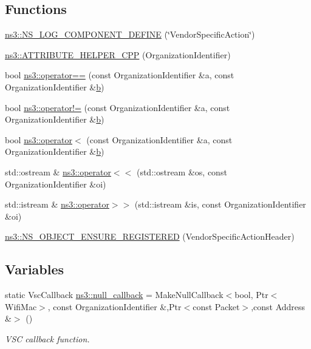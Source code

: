 \subsection*{Functions}
\begin{DoxyCompactItemize}
\item 
\hyperlink{namespacens3_a807d7c8e67d1324dc975f22d670e5a4f}{ns3\+::\+N\+S\+\_\+\+L\+O\+G\+\_\+\+C\+O\+M\+P\+O\+N\+E\+N\+T\+\_\+\+D\+E\+F\+I\+NE} (\char`\"{}Vendor\+Specific\+Action\char`\"{})
\item 
\hyperlink{namespacens3_aee3a175c2cc683e714fb85583ba0d12b}{ns3\+::\+A\+T\+T\+R\+I\+B\+U\+T\+E\+\_\+\+H\+E\+L\+P\+E\+R\+\_\+\+C\+PP} (Organization\+Identifier)
\item 
bool \hyperlink{namespacens3_a9e29113f13a2a1220c1c0a6fc5347a9e}{ns3\+::operator==} (const Organization\+Identifier \&a, const Organization\+Identifier \&\hyperlink{lte__pathloss_8m_a21ad0bd836b90d08f4cf640b4c298e7c}{b})
\item 
bool \hyperlink{namespacens3_a64cae6c5e3aa1167d01e2277852dd5c4}{ns3\+::operator!=} (const Organization\+Identifier \&a, const Organization\+Identifier \&\hyperlink{lte__pathloss_8m_a21ad0bd836b90d08f4cf640b4c298e7c}{b})
\item 
bool \hyperlink{namespacens3_ae4c8c7458287a990226d5bc119b95540}{ns3\+::operator$<$} (const Organization\+Identifier \&a, const Organization\+Identifier \&\hyperlink{lte__pathloss_8m_a21ad0bd836b90d08f4cf640b4c298e7c}{b})
\item 
std\+::ostream \& \hyperlink{namespacens3_a37adfb11e72f1c6473c5e3883906aa32}{ns3\+::operator$<$$<$} (std\+::ostream \&os, const Organization\+Identifier \&oi)
\item 
std\+::istream \& \hyperlink{namespacens3_a63bb3586b7d2f668b0ebf0abad4774c7}{ns3\+::operator$>$$>$} (std\+::istream \&is, const Organization\+Identifier \&oi)
\item 
\hyperlink{namespacens3_a294d826ea6bb76c8b8fe2d8e5b06e3f9}{ns3\+::\+N\+S\+\_\+\+O\+B\+J\+E\+C\+T\+\_\+\+E\+N\+S\+U\+R\+E\+\_\+\+R\+E\+G\+I\+S\+T\+E\+R\+ED} (Vendor\+Specific\+Action\+Header)
\end{DoxyCompactItemize}
\subsection*{Variables}
\begin{DoxyCompactItemize}
\item 
static Vsc\+Callback \hyperlink{namespacens3_a0d157a5f3783cb65a98e456c07f38949}{ns3\+::null\+\_\+callback} = Make\+Null\+Callback$<$bool, Ptr$<$Wifi\+Mac$>$, const Organization\+Identifier \&,Ptr$<$const Packet$>$,const Address \&$>$ ()
\begin{DoxyCompactList}\small\item\em V\+SC callback function. \end{DoxyCompactList}\end{DoxyCompactItemize}
